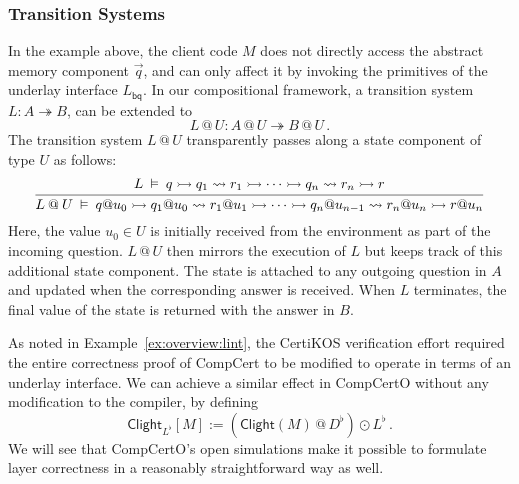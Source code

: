 \documentclass[acmsmall,screen,review,anonymous]{acmart}
\newcommand{\kw}[1]{\ensuremath{ \mathsf{#1} }}
\newcommand{\que}{\circ}
\newcommand{\ans}{\bullet}
\begin{document}
\subsubsection{Transition Systems} \label{sec:overview:slift:ts} %

In the example above,
the client code $M$ does not directly access
the abstract memory component $\vec{q}$, %
and can only affect it by invoking
the primitives of the underlay interface $L_\kw{bq}$.
In our compositional framework,
a transition system
$L : A \twoheadrightarrow B$,
can be extended to
\[
  L \mathbin@ U : A \mathbin@ U \twoheadrightarrow B \mathbin@ U
  \,.
\]
The transition system $L \mathbin@ U$ transparently passes along
a state component of type $U$ as follows:
\begin{equation} \label{eqn:slift}
  \begin{prooftree}
  \hypo{
  L \:\vDash\: q \rightarrowtail
    q_1 \leadsto r_1 \rightarrowtail
    \cdots \rightarrowtail
    q_n \leadsto r_n \rightarrowtail
    r
  }
  \infer1{
  L \mathbin@ U \:\vDash\: q@u_0 \rightarrowtail
    q_1@u_0 \leadsto r_1@u_1 \rightarrowtail
    \cdots \rightarrowtail
    q_n@u_{n-1} \leadsto r_n@u_n \rightarrowtail
    r@u_n
  }
  \end{prooftree}
\end{equation}
Here, the value $u_0 \in U$
is initially received from the environment as part of the incoming question.
$L \mathbin@ U$ then mirrors the execution of $L$
but keeps track of this additional state component.
The state is attached to any outgoing question in $A$
and updated when the corresponding answer is received.
When $L$ terminates,
the final value of the state is returned with the answer in $B$.

\begin{example} %
As noted in Example~\ref{ex:overview:lint},
the CertiKOS verification effort
required the entire correctness proof of CompCert
to be modified to operate in terms of an underlay interface.
We can achieve a similar effect in CompCertO
without any modification to the compiler,
by defining
\[
  \kw{Clight}_{L^\flat}[M] :=
    (\kw{Clight}(M) \mathbin@ D^\flat) \odot L^\flat
  \,.
\]
We will see that CompCertO's open simulations
make it possible to formulate layer correctness
in a reasonably straightforward way as well.
\end{example}

\end{document}
